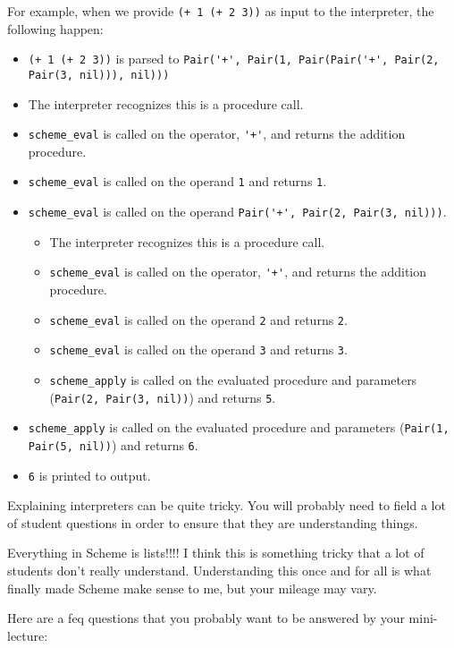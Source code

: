 For example, when we provide \lstinline{(+ 1 (+ 2 3))} as input to the interpreter, the following happen: 
\begin{itemize}
    \item \lstinline{(+ 1 (+ 2 3))} is parsed to \lstinline{Pair('+', Pair(1, Pair(Pair('+', Pair(2, Pair(3, nil))), nil)))}
    \item The interpreter recognizes this is a procedure call. 
    \item \lstinline{scheme_eval} is called on the operator, \lstinline{'+'}, and returns the addition procedure.
    \item \lstinline{scheme_eval} is called on the operand \lstinline{1} and returns \lstinline{1}. 
    \item \lstinline{scheme_eval} is called on the operand \lstinline{Pair('+', Pair(2, Pair(3, nil)))}. 
    \begin{itemize}
        \item The interpreter recognizes this is a procedure call. 
        \item \lstinline{scheme_eval} is called on the operator, \lstinline{'+'}, and returns the addition procedure.
        \item \lstinline{scheme_eval} is called on the operand \lstinline{2} and returns \lstinline{2}. 
        \item \lstinline{scheme_eval} is called on the operand \lstinline{3} and returns \lstinline{3}. 
        \item \lstinline{scheme_apply} is called on the evaluated procedure and parameters (\lstinline{Pair(2, Pair(3, nil))}) and returns \lstinline{5}. 
    \end{itemize}
    \item \lstinline{scheme_apply} is called on the evaluated procedure and parameters (\lstinline{Pair(1, Pair(5, nil))}) and returns \lstinline{6}. 
    \item \lstinline{6} is printed to output. 
\end{itemize}

\begin{meta}
Explaining interpreters can be quite tricky. You will probably need to field a lot of student questions
in order to ensure that they are understanding things. 

Everything in Scheme is lists!!!! I think this is something tricky that a lot of students don't really understand. 
Understanding this once and for all is what finally made Scheme make sense to me, but your mileage may
vary. 

Here are a feq questions that you probably want to be answered by your mini-lecture: 

\end{meta}